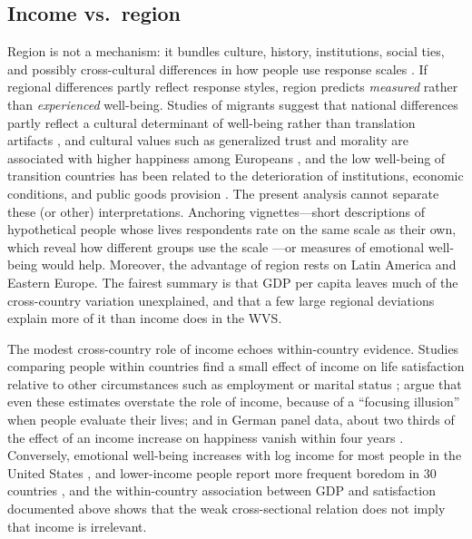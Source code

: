 \documentclass[12pt]{article}
\begin{document}
\subsection{Income vs.\ region}
Region is not a mechanism: it bundles culture, history, institutions, social ties, and possibly cross-cultural differences in how people use response scales \citep{chen_response_1995,diener_personality_2003,exton_comparing_2015}. If regional differences partly reflect response styles, region predicts \textit{measured} rather than \textit{experienced} well-being. Studies of migrants suggest that national differences partly reflect a cultural determinant of well-being rather than translation artifacts \citep{senik_french_2014,exton_comparing_2015}, and cultural values such as generalized trust and morality are associated with higher happiness among Europeans \citep{conzo_cultural_2017}, and the low well-being of transition countries has been related to the deterioration of institutions, economic conditions, and public goods provision %
\citep{guriev_unhappiness_2009}. The present analysis cannot separate these (or other) interpretations. Anchoring vignettes---short descriptions of hypothetical people whose lives respondents rate on the same scale as their own, which reveal how different groups use the scale \citep{kapteyn_life_2010}---or measures of emotional well-being would help.
Moreover, the advantage of region rests on Latin America and Eastern Europe. The fairest summary is that GDP per capita leaves much of the cross-country variation unexplained, and that a few large regional deviations explain more of it than income does in the WVS.

The modest cross-country role of income echoes within-country evidence. Studies comparing people within countries find a small effect of income on life satisfaction relative to other circumstances such as employment or marital status \citep{helliwell_hows_2003,blanchflower_well-being_2004}; \citet{kahneman_would_2006} argue that even these estimates overstate the role of income, because of a ``focusing illusion'' when people evaluate their lives; and in German panel data, about two thirds of the effect of an income increase on happiness vanish within four years \citep{di_tella_happiness_2010}. Conversely, emotional well-being increases with log income for most people in the United States \citep{killingsworth_income_2023}, and lower-income people report more frequent boredom in 30 countries \citep{pirla_income_2025}, and the within-country association between GDP and satisfaction documented above shows that the weak cross-sectional relation does not imply that income is irrelevant.
\end{document}
